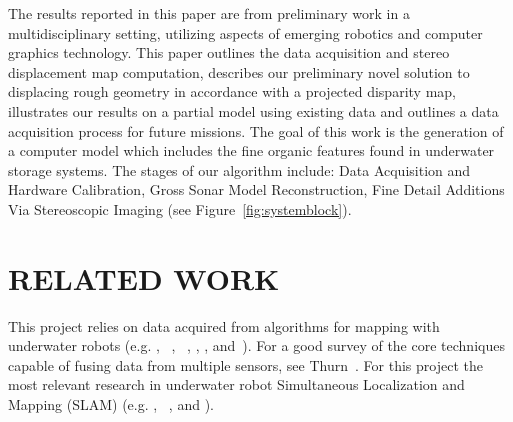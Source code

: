 \documentclass[a4paper,twoside]{article}
\begin{document}

The results reported in this paper are from preliminary work in a multidisciplinary setting, utilizing aspects of emerging robotics and computer graphics technology.  This paper outlines the data acquisition and stereo displacement map computation, describes our preliminary novel solution to displacing rough geometry in accordance with a projected disparity map, illustrates our results on a partial model using existing data and outlines a data acquisition process for future missions. The goal of this work is the generation of a computer model which includes the fine organic features found in underwater storage systems.
The stages of our algorithm include: Data Acquisition and Hardware Calibration, Gross Sonar Model Reconstruction, Fine Detail Additions Via Stereoscopic Imaging (see Figure~\ref{fig:systemblock}).

\begin{figure*}[!ht]
  \vspace{-0.2cm}
  \caption{Pipeline for fine detail additions to sonar generated meshes.}
 \label{fig:systemblock}
\end{figure*}

\section{\uppercase{Related Work}}
\label{sec:data}

This project relies on data acquired from algorithms for mapping with underwater robots (e.g. \cite{Williams2000}, ~\cite{Williams09}, ~\cite{opizarro-2009a}, \cite{Fairfield2005,Fairfield2006}, \cite{Clark2008b}, and~\cite{White10}). For a good survey of the core techniques capable of fusing data from multiple sensors, see Thurn~\cite{Thrun2005}.
For this project the most relevant  research in underwater robot Simultaneous Localization and Mapping (SLAM) (e.g. \cite{Williams2000}, ~\cite{harbor}, and \cite{Fairfield2005,Fairfield2006}).  
\end{document}
